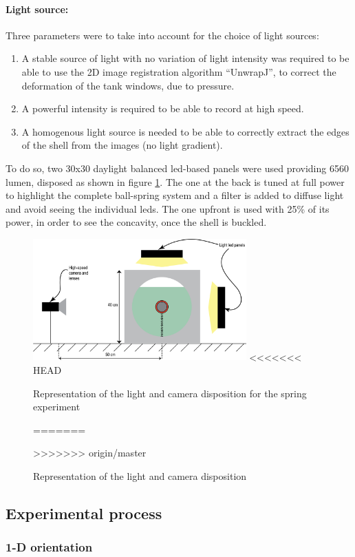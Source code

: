 \paragraph{Light source:}
Three parameters were to take into account for the choice of light sources:
\begin{enumerate}
	\item A stable source of light with no variation of light intensity was required to be able to use the 2D image registration algorithm "`UnwrapJ"', to correct the deformation of the tank windows, due to pressure.
	\item A powerful intensity is required to be able to record at high speed.
	\item A homogenous light source is needed to be able to correctly extract the edges of the shell from the images (no light gradient).	
\end{enumerate}
To do so, two 30x30 daylight balanced led-based panels were used providing 6560 lumen, disposed as shown in figure \ref{fig:schematics_spring}. The one at the back is tuned at full power to highlight the complete ball-spring system and a filter is added to diffuse light and avoid seeing the individual leds. The one upfront is used with 25\% of its power, in order to see the concavity, once the shell is buckled.
\begin{figure}[H] %
	\centering%
  \includegraphics[width=0.73\textwidth]{figures/Chapter_1/schematic_experimental_setup_light_lenses.png}
<<<<<<< HEAD
	\caption{Representation of the light and camera disposition for the spring experiment}
=======
	\caption{Representation of the light and camera disposition}
>>>>>>> origin/master
	\label{fig:schematics_spring}
\end{figure}
\newpage
\subsection{Experimental process}
\subsubsection{1-D orientation}
